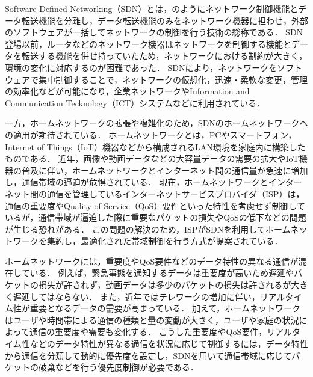 \documentclass[a4paper,11pt,uplatex]{ujreport}
\begin{document}
  Software-Defined Networking（SDN）とは，のようにネットワーク制御機能とデータ転送機能を分離し，データ転送機能のみをネットワーク機器に担わせ，外部のソフトウェアが一括してネットワークの制御を行う技術の総称である．
  SDN登場以前，ルータなどのネットワーク機器はネットワークを制御する機能とデータを転送する機能を併せ持っていたため，ネットワークにおける制約が大きく，環境の変化に対応するのが困難であった．
  SDNにより，ネットワークをソフトウェアで集中制御することで，ネットワークの仮想化，迅速・柔軟な変更，管理の効率化などが可能になり，企業ネットワークやInformation and Communication Tecknology（ICT）システムなどに利用されている\cite{NEC}．\par
  一方，ホームネットワークの拡張や複雑化のため，SDNのホームネットワークへの適用が期待されている\cite{SDNSurvey}．
  ホームネットワークとは，PCやスマートフォン，Internet of Things（IoT）機器などから構成されるLAN環境を家庭内に構築したものである．
  近年，画像や動画データなどの大容量データの需要の拡大やIoT機器の普及に伴い，ホームネットワークとインターネット間の通信量が急速に増加し，通信帯域の逼迫が危惧されている\cite{ガイドライン}．
  現在，ホームネットワークとインターネット間の通信を管理しているインターネットサービスプロバイダ（ISP）は，通信の重要度やQuality of Service（QoS）要件といった特性を考慮せず制御しているが，通信帯域が逼迫した際に重要なパケットの損失やQoSの低下などの問題が生じる恐れがある．
  この問題の解決のため，ISPがSDNを利用してホームネットワークを集約し，最適化された帯域制御を行う方式が提案されている\cite{Framework}．\par
  ホームネットワークには，重要度やQoS要件などのデータ特性の異なる通信が混在している．
  例えば，緊急事態を通知するデータは重要度が高いため遅延やパケットの損失が許されず，動画データは多少のパケットの損失は許されるが大きく遅延してはならない．
  また，近年ではテレワークの増加に伴い，リアルタイム性が重要となるデータの需要が高まっている．
  加えて，ホームネットワークはユーザや時間帯による通信の種類と量の変動が大きく，ユーザや家庭の状況によって通信の重要度や需要も変化する\cite{Pattern}．
  こうした重要度やQoS要件，リアルタイム性などのデータ特性が異なる通信を状況に応じて制御するには，データ特性から通信を分類して動的に優先度を設定し，SDNを用いて通信帯域に応じてパケットの破棄などを行う優先度制御が必要である．
\end{document}
